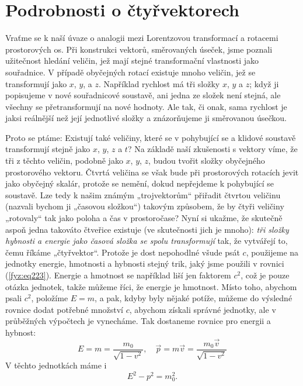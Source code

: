   \section{Podrobnosti o čtyřvektorech}\label{fyz:IchapXVIIsecIV}
    Vraťme se k naší úvaze o analogii mezi Lorentzovou transformací a rotacemi prostorových os. Při 
    konstrukci vektorů, směrovaných úseček, jsme poznali užitečnost hledání veličin, jež mají 
    stejné transformační vlastnosti jako souřadnice. V případě obyčejných rotací existuje mnoho 
    veličin, jež se transformují jako \(x\), \(y\), a \(z\). Například rychlost má tři složky 
    \(x\), \(y\) a \(z\); když ji popisujeme v nové souřadnicové soustavě, ani jedna ze složek není 
    stejná, ale všechny se přetransformují na nové hodnoty. Ale tak, či onak, sama rychlost je 
    jaksi reálnější než její jednotlivé složky a znázorňujeme ji směrovanou úsečkou.
    
    Proto se ptáme: Existují také veličiny, které se v pohybující se a klidové soustavě 
    transformují stejně jako \(x\), \(y\), \(z\) a \(t\)? Na základě naší zkušenosti s vektory 
    víme, že tři z těchto veličin, podobně jako \(x\), \(y\), \(z\), budou tvořit složky obyčejného 
    prostorového vektoru. Čtvrtá veličina se však bude při prostorových rotacích jevit jako 
    obyčejný skalár, protože se nemění, dokud nepřejdeme k pohybující se soustavě. Lze tedy k našim 
    známým „trojvektorům“ přiřadit čtvrtou veličinu (nazvali bychom ji „časovou složkou“) takovým 
    způsobem, že by čtyři veličiny „rotovaly“ tak jako poloha a čas v prostoročase? Nyní si ukažme, 
    že skutečně aspoň jedna takováto čtveřice existuje (ve skutečnosti jich je mnoho): \emph{tři 
    složky hybnosti a energie jako časová složka se spolu transformují} tak, že vytvářejí to, čemu 
    říkáme „čtyřvektor“. Protože je dost nepohodlné všude psát \(c\), použijeme na jednotky 
    energie, hmotnosti a hybnosti stejný trik, jaký jsme použili v rovnici (\ref{fyz:eq223}). 
    Energie a hmotnost se například liší jen faktorem \(c^2\), což je pouze otázka jednotek, takže 
    můžeme říci, že energie je hmotnost. Místo toho, abychom psali \(c^2\), položíme \(E = m\), a 
    pak, kdyby byly nějaké potíže, můžeme do výsledné rovnice dodat potřebné množství \(c\), 
    abychom získali správné jednotky, ale v průběžných výpočtech je vynecháme. Tak dostaneme 
    rovnice pro energii a hybnost:
    \begin{equation}\label{fyz:eq225}
      E = m = \dfrac{m_0}{\sqrt{1 - v^2}}, \quad
      \vec{p} = m\vec{v} = \dfrac{m_0\vec{v}}{\sqrt{1 - v^2}}
    \end{equation}
    V těchto jednotkách máme i
    \begin{equation}\label{fyz:eq226}
      E^2 - p^2 = m_0^2.
    \end{equation}
    
